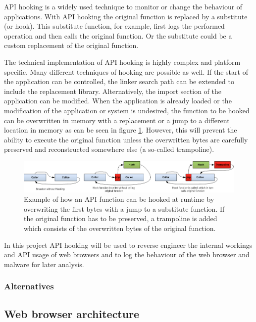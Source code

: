 API hooking is a widely used technique to monitor or change the behaviour of applications. With API hooking the original function is replaced by a substitute (or hook). This substitute function, for example, first logs the performed operation and then calls the original function. Or the substitute could be a custom replacement of the original function.

The technical implementation of API hooking is highly complex and platform specific. Many different techniques \cite{jbremer2012} of hooking are possible as well. If the start of the application can be controlled, the linker search path can be extended to include the replacement library. Alternatively, the import section of the application can be modified. When the application is already loaded or the modification of the application or system is undesired, the function to be hooked can be overwritten in memory with a replacement or a jump to a different location in memory as can be seen in figure \ref{fig:apihooking}. However, this will prevent the ability to execute the original function unless the overwritten bytes are carefully preserved and reconstructed somewhere else (a so-called trampoline).

\begin{figure}
    \centering
    \includegraphics[width=14.7cm]{Images/API-hooking.png}
    \caption{Example of how an API function can be hooked at runtime by overwriting the first bytes with a jump to a substitute function. If the original function has to be preserved, a trampoline is added which consists of the overwritten bytes of the original function. \cite{APIHookImage}}
    \label{fig:apihooking}
\end{figure}

In this project API hooking will be used to reverse engineer the internal workings and API usage of web browsers and to log the behaviour of the web browser and malware for later analysis.

\subsubsection{Alternatives}



\subsection{Web browser architecture}

